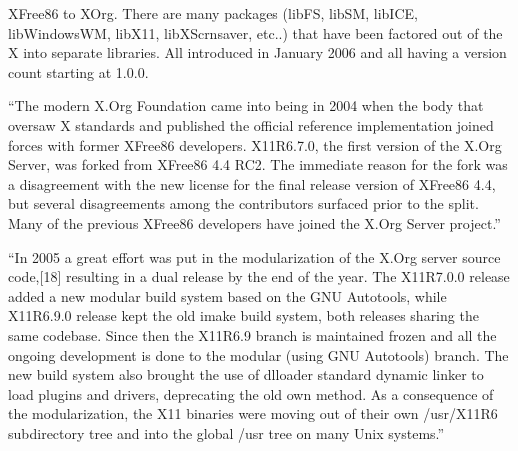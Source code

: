 \documentclass[smallextended,final]{svjour3}
\begin{document}
XFree86 to XOrg. There are many packages (libFS, libSM, libICE, libWindowsWM, libX11, libXScrnsaver, etc..) that have been factored out of the X into separate libraries. All introduced in January 2006 and all having a version count starting at 1.0.0.

“The modern X.Org Foundation came into being in 2004 when the body that oversaw X standards and published the official reference implementation joined forces with former XFree86 developers. X11R6.7.0, the first version of the X.Org Server, was forked from XFree86 4.4 RC2. The immediate reason for the fork was a disagreement with the new license for the final release version of XFree86 4.4, but several disagreements among the contributors surfaced prior to the split. Many of the previous XFree86 developers have joined the X.Org Server project.”

“In 2005 a great effort was put in the modularization of the X.Org server source code,[18] resulting in a dual release by the end of the year. The X11R7.0.0 release added a new modular build system based on the GNU Autotools, while X11R6.9.0 release kept the old imake build system, both releases sharing the same codebase. Since then the X11R6.9 branch is maintained frozen and all the ongoing development is done to the modular (using GNU Autotools) branch. The new build system also brought the use of dlloader standard dynamic linker to load plugins and drivers, deprecating the old own method. As a consequence of the modularization, the X11 binaries were moving out of their own /usr/X11R6 subdirectory tree and into the global /usr tree on many Unix systems.”

\end{document}
